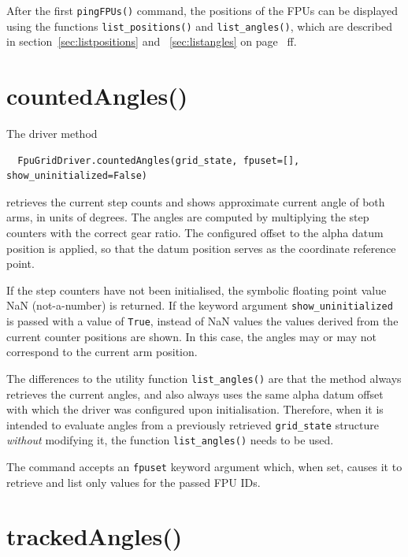 \documentclass[fontsize=12,a4paper]{scrreprt}
\begin{document}
After the first \texttt{pingFPUs()} command, the positions of the FPUs
can be displayed using the functions \texttt{list\_positions()} and
\texttt{list\_angles()}, which are described in
section~\ref{sec:listpositions} and ~\ref{sec:listangles} on
page~\pageref{sec:listpositions} ff.


\section{countedAngles()}
\label{sec:countedangles}

The driver method

\begin{verbatim}
  FpuGridDriver.countedAngles(grid_state, fpuset=[], show_uninitialized=False)
\end{verbatim}
retrieves the current step counts and shows approximate current angle
of both arms, in units of degrees. The angles are computed by
multiplying the step counters with the correct gear ratio. The
configured offset to the alpha datum position is applied, so that the
datum position serves as the coordinate reference point.

If the step counters have not been initialised, the symbolic floating
point value NaN (not-a-number) is returned.  If the keyword argument
\texttt{show\_uninitialized} is passed with a value of \texttt{True},
instead of NaN values the values derived from the current counter
positions are shown. In this case, the angles may or may not
correspond to the current arm position.

The differences to the utility function \texttt{list\_angles()} are
that the method always retrieves the current angles, and also always
uses the same alpha datum offset with which the driver was configured
upon initialisation. Therefore, when it is intended to evaluate angles
from a previously retrieved \texttt{grid\_state} structure
\emph{without} modifying it, the function \texttt{list\_angles()}
needs to be used.

The command accepts an \texttt{fpuset} keyword argument which, when
set, causes it to retrieve and list only values for the passed FPU
IDs.


\section{trackedAngles()}
\label{sec:trackedangles}
\end{document}
